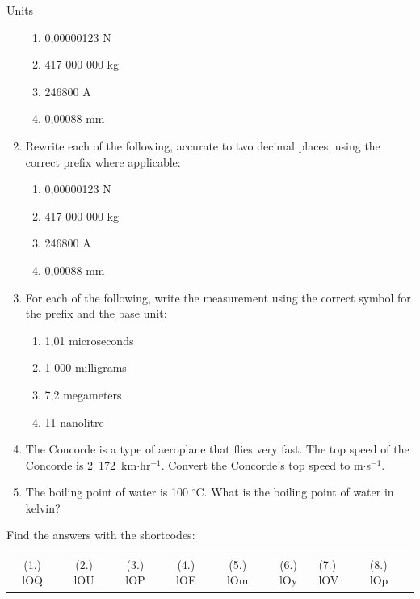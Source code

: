 \begin{eocexercises}{Units}
\begin{enumerate}[noitemsep, label=\textbf{\arabic*}. ]
\label{m30853*id68302}\begin{enumerate}[noitemsep, label=\textbf{\alph*}. ] 
            \label{m30853*uid79}\item 0,00000123 N
\label{m30853*uid80}\item 417 000 000 kg
\label{m30853*uid81}\item 246800 A
\label{m30853*uid82}\item 0,00088 mm
\end{enumerate}
                \label{m30853*uid83}\item Rewrite each of the following, accurate to two decimal places, using the correct prefix where applicable:
\label{m30853*id68367}\begin{enumerate}[noitemsep, label=\textbf{\alph*}. ] 
            \label{m30853*uid84}\item 0,00000123 N
\label{m30853*uid85}\item 417 000 000 kg
\label{m30853*uid86}\item 246800 A
\label{m30853*uid87}\item 0,00088 mm
\end{enumerate}
                \label{m30853*uid88}\item For each of the following, write the measurement using the correct symbol for the prefix and the base unit:
\label{m30853*id68433}\begin{enumerate}[noitemsep, label=\textbf{\alph*}. ] 
            \label{m30853*uid89}\item 1,01 microseconds
\label{m30853*uid90}\item 1 000 milligrams
\label{m30853*uid91}\item 7,2 megameters
\label{m30853*uid92}\item 11 nanolitre
\end{enumerate}
                \label{m30853*uid93}\item The Concorde is a type of aeroplane that flies very fast. The top speed of the Concorde is 2~172~km$\ensuremath{\cdot}$hr${}^{-1}$. Convert the Concorde's top speed to m$\ensuremath{\cdot}$s${}^{-1}$.        
\label{m30853*uid94}\item The boiling point of water is 100 ${}^{\circ }$C. What is the boiling point of water in kelvin?        
\end{enumerate}
  \label{m30853**end}
\par {} Find the answers with the shortcodes:
 \par \begin{tabular}[h]{cccccc}
 (1.) lOQ  &  (2.) lOU  &  (3.) lOP  &  (4.) lOE  &  (5.) lOm  &  (6.) lOy  &  (7.) lOV  &  (8.) lOp  & \end{tabular}
\end{eocexercises}
